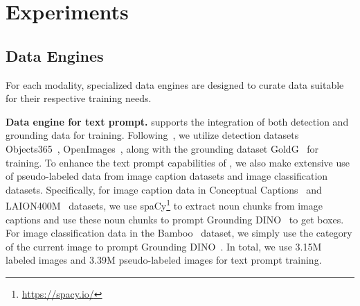 \section{Experiments}
\subsection{Data Engines}
For each modality, specialized data engines are designed to curate data suitable for their respective training needs.



\noindent\textbf{Data engine for text prompt.} \ourmodel{} supports the integration of both detection and grounding data for training. Following~\cite{liu2023grounding, li2022grounded}, we utilize detection datasets Objects365~\cite{shao2019objects365}, OpenImages~\cite{krasin2017openimages}, along with the grounding dataset GoldG~\cite{kamath2021mdetr} for training. To enhance the text prompt capabilities of \ourmodel{}, we also make extensive use of pseudo-labeled data from image caption datasets and image classification datasets. Specifically, for image caption data in Conceptual Captions~\cite{sharma2018conceptual} and LAION400M~\cite{schuhmann2021laion} datasets, we use spaCy\footnote{\url{https://spacy.io/}} to extract noun chunks from image captions and use these noun chunks to prompt Grounding DINO~\cite{liu2023grounding} to get boxes. For image classification data in the Bamboo~\cite{zhang2022bamboo} dataset, we simply use the category of the current image to prompt Grounding DINO~\cite{liu2023grounding}. In total, we use 3.15M labeled images and 3.39M pseudo-labeled images for text prompt training.

